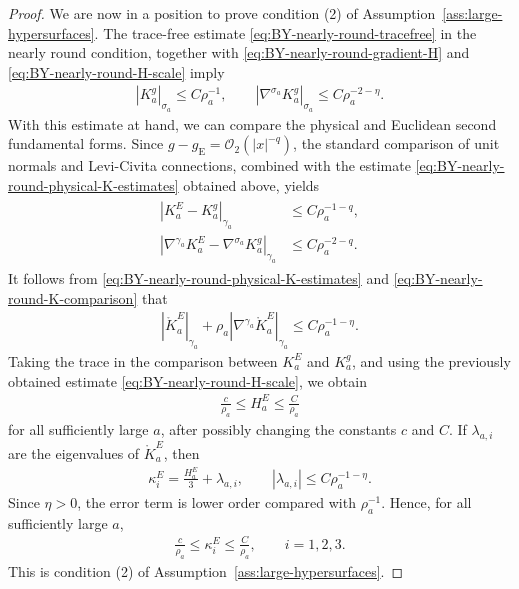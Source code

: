 \documentclass[10pt,a4paper]{amsart}
\newcommand{\gE}{g_{\mathrm{E}}}
\begin{document}
\begin{proof}
		We are now in a position to prove condition \textup{(2)} of Assumption~\ref{ass:large-hypersurfaces}. The trace-free estimate \eqref{eq:BY-nearly-round-tracefree} in the nearly round condition, together with \eqref{eq:BY-nearly-round-gradient-H} and
		\eqref{eq:BY-nearly-round-H-scale} imply
		\begin{align}\label{eq:BY-nearly-round-physical-K-estimates}
			|K_a^g|_{\sigma_a}
			\leq
			C\rho_a^{-1},
			\qquad
			\left|
			\nabla^{\sigma_a}K_a^g
			\right|_{\sigma_a}
			\leq
			C\rho_a^{-2-\eta}.
		\end{align}
		With this estimate at hand, we can compare the physical and Euclidean second fundamental forms. Since $g - \gE = \mathcal{O}_2(|x|^{-q})$, the standard comparison of unit normals and Levi-Civita connections, combined with the estimate \eqref{eq:BY-nearly-round-physical-K-estimates} obtained above, yields
		\begin{align}\label{eq:BY-nearly-round-K-comparison}
			\begin{split}
				\left|
				K_a^E-K_a^g
				\right|_{\gamma_a}
				&\leq
				C\rho_a^{-1-q},
				\\
				\left|
				\nabla^{\gamma_a}K_a^E
				-
				\nabla^{\sigma_a}K_a^g
				\right|_{\gamma_a}
				&\leq
				C\rho_a^{-2-q}.
			\end{split}
		\end{align}
		It follows from
		\eqref{eq:BY-nearly-round-physical-K-estimates} and
		\eqref{eq:BY-nearly-round-K-comparison} that
		\begin{align}
			\left|
			\mathring K_a^E
			\right|_{\gamma_a}
			+
			\rho_a
			\left|
			\nabla^{\gamma_a}\mathring K_a^E
			\right|_{\gamma_a}
			\leq
			C\rho_a^{-1-\eta}.
		\end{align}
		Taking the trace in the comparison between $K_a^E$ and $K_a^g$, and using the previously obtained estimate \eqref{eq:BY-nearly-round-H-scale}, we obtain
		\begin{align}\label{eq:mean-curvature-bound}
			\frac{c}{\rho_a}
			\leq
			H_a^E
			\leq
			\frac{C}{\rho_a}
		\end{align}
		for all sufficiently large $a$, after possibly changing the constants $c$ and $C$. If $\lambda_{a,i}$ are the eigenvalues of
		$\mathring K_a^E$, then
		\begin{align*}
			\kappa_i^E
			=
			\frac{H_a^E}{3}
			+
			\lambda_{a,i},
			\qquad
			|\lambda_{a,i}|
			\leq
			C\rho_a^{-1-\eta}.
		\end{align*}
		Since $\eta>0$, the error term is lower order compared with
		$\rho_a^{-1}$. Hence, for all sufficiently large $a$,
		\begin{align*}
			\frac{c}{\rho_a}
			\leq
			\kappa_i^E
			\leq
			\frac{C}{\rho_a},
			\qquad
			i=1,2,3.
		\end{align*}
		This is condition \textup{(2)} of
		Assumption~\ref{ass:large-hypersurfaces}.
	\end{proof}
	
\end{document}
